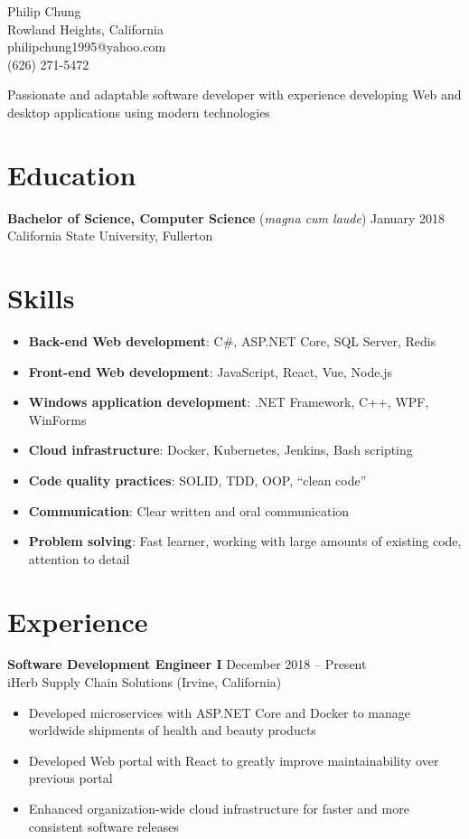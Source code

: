 \documentclass[10pt]{article}
\newcommand{\baseheader}[3]{#1 \hfill #2 \\ #3}
\newcommand{\locheader}[4]{\baseheader{\textbf{#1}}{#2}{#3 (#4)}}
\begin{document}
	\begin{center}
		{\LARGE Philip Chung} \\
		Rowland Heights, California \\
		philipchung1995@yahoo.com \\
		(626) 271-5472 \\
	\end{center}

	Passionate and adaptable software developer with experience developing Web and desktop applications using modern technologies

	\section*{Education}

	\baseheader{\textbf{Bachelor of Science, Computer Science} (\textit{magna cum laude})}{January 2018}{California State University, Fullerton}

	\section*{Skills}

	\newcommand{\skillitem}[2]{\item \textbf{#1}: #2}

	\begin{itemize}
		\skillitem{Back-end Web development}{C\#, ASP.NET Core, SQL Server, Redis}
		\skillitem{Front-end Web development}{JavaScript, React, Vue, Node.js}
		\skillitem{Windows application development}{.NET Framework, C++, WPF, WinForms}
		\skillitem{Cloud infrastructure}{Docker, Kubernetes, Jenkins, Bash scripting}
		\skillitem{Code quality practices}{SOLID, TDD, OOP, ``clean code''}
		\skillitem{Communication}{Clear written and oral communication}
		\skillitem{Problem solving}{Fast learner, working with large amounts of existing code, attention to detail}
	\end{itemize}

	\section*{Experience}

	\locheader{Software Development Engineer I}{December 2018 -- Present}{iHerb Supply Chain Solutions}{Irvine, California}

	\begin{itemize}
		\item Developed microservices with ASP.NET Core and Docker to manage worldwide shipments of health and beauty products
		\item Developed Web portal with React to greatly improve maintainability over previous portal
		\item Enhanced organization-wide cloud infrastructure for faster and more consistent software releases
	\end{itemize}
\end{document}
